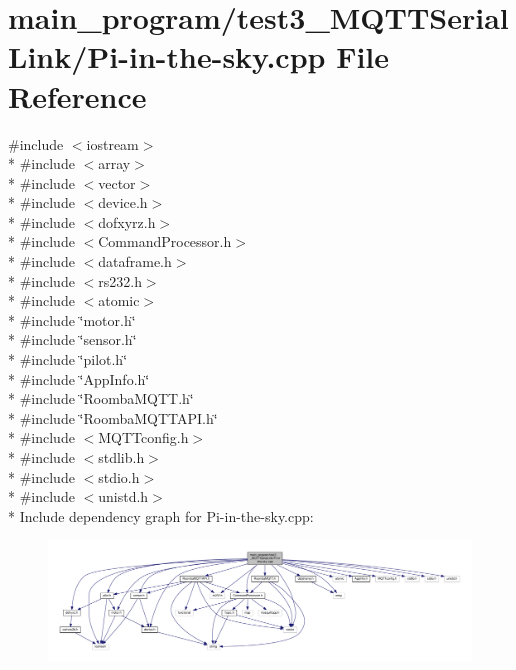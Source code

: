 \hypertarget{test3___m_q_t_t_serial_link_2_pi-in-the-sky_8cpp}{}\section{main\+\_\+program/test3\+\_\+\+M\+Q\+T\+T\+Serial\+Link/\+Pi-\/in-\/the-\/sky.cpp File Reference}
\label{test3___m_q_t_t_serial_link_2_pi-in-the-sky_8cpp}
{\ttfamily \#include $<$iostream$>$}\\*
{\ttfamily \#include $<$array$>$}\\*
{\ttfamily \#include $<$vector$>$}\\*
{\ttfamily \#include $<$device.\+h$>$}\\*
{\ttfamily \#include $<$dofxyrz.\+h$>$}\\*
{\ttfamily \#include $<$Command\+Processor.\+h$>$}\\*
{\ttfamily \#include $<$dataframe.\+h$>$}\\*
{\ttfamily \#include $<$rs232.\+h$>$}\\*
{\ttfamily \#include $<$atomic$>$}\\*
{\ttfamily \#include \char`\"{}motor.\+h\char`\"{}}\\*
{\ttfamily \#include \char`\"{}sensor.\+h\char`\"{}}\\*
{\ttfamily \#include \char`\"{}pilot.\+h\char`\"{}}\\*
{\ttfamily \#include \char`\"{}App\+Info.\+h\char`\"{}}\\*
{\ttfamily \#include \char`\"{}Roomba\+M\+Q\+T\+T.\+h\char`\"{}}\\*
{\ttfamily \#include \char`\"{}Roomba\+M\+Q\+T\+T\+A\+P\+I.\+h\char`\"{}}\\*
{\ttfamily \#include $<$M\+Q\+T\+Tconfig.\+h$>$}\\*
{\ttfamily \#include $<$stdlib.\+h$>$}\\*
{\ttfamily \#include $<$stdio.\+h$>$}\\*
{\ttfamily \#include $<$unistd.\+h$>$}\\*
Include dependency graph for Pi-\/in-\/the-\/sky.cpp\+:
\nopagebreak
\begin{figure}[H]
\begin{center}
\leavevmode
\includegraphics[width=350pt]{test3___m_q_t_t_serial_link_2_pi-in-the-sky_8cpp__incl}
\end{center}
\end{figure}
